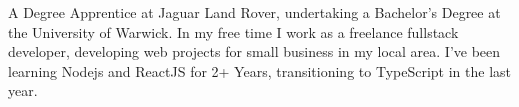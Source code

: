 

\begin{cvparagraph}

A Degree Apprentice at Jaguar Land Rover, undertaking a Bachelor's Degree at the University of Warwick. In my free time I work as a freelance fullstack developer, developing web projects for small business in my local area. I've been learning Nodejs and ReactJS for 2+ Years, transitioning to TypeScript in the last year.
\end{cvparagraph}